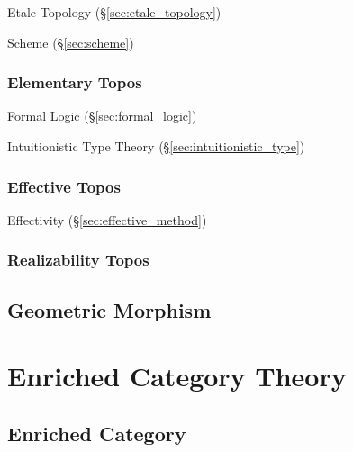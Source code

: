 Etale Topology (\S\ref{sec:etale_topology})

Scheme (\S\ref{sec:scheme})



\subsubsection{Elementary Topos}\label{sec:elementary_topos}

Formal Logic (\S\ref{sec:formal_logic})

Intuitionistic Type Theory (\S\ref{sec:intuitionistic_type})



\subsubsection{Effective Topos}\label{sec:effective_topos}

Effectivity (\S\ref{sec:effective_method})



\subsubsection{Realizability Topos}\label{sec:realizability_topos}



\subsection{Geometric Morphism}\label{sec:geometric_morphism}



\section{Enriched Category Theory}\label{sec:enriched_category_theory}

\subsection{Enriched Category}\label{sec:enriched_category}

